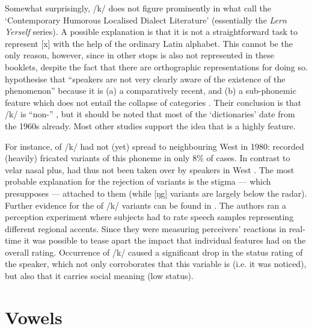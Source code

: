 Somewhat surprisingly, /k/  does not figure prominently in what \textcite{honeybonewatson2013} call the `Contemporary Humorous Localised Dialect Literature' (essentially the \emph{Lern Yerself } series).
A possible explanation is that it is not a straightforward task to represent [x] with the help of the ordinary Latin alphabet.
This cannot be the only reason, however, since  in other stops is also not represented in these booklets, despite the fact that there are orthographic representations for doing so.
\textcite{honeybonewatson2013} hypothesise that ``speakers are not very clearly aware of the existence of the phenomenon'' because it is (a) a comparatively recent, and (b) a sub-phonemic feature which does not entail the collapse of categories \parencite[cf.][329--331]{honeybonewatson2013}.
Their conclusion is that /k/  is ``non-'' \parencite[333]{honeybonewatson2013}, but it should be noted that most of the  `dictionaries' date from the 1960s already.
Most other studies support the idea that  is a highly  feature.

For instance,  of /k/ had not (yet) spread to neighbouring West  in 1980: \textcite[97]{newbrook1999} recorded (heavily) fricated variants of this phoneme in only 8\% of cases.
In contrast to velar nasal plus,   had thus not been taken over by speakers in West .
The most probable explanation for the rejection of  variants is the stigma --- which presupposes  --- attached to them (while [ŋg] variants are largely below the radar).
Further evidence for the  of  /k/ variants can be found in \citealt{watsonclark2015}.
The authors ran a perception experiment where subjects had to rate speech samples representing different regional accents.
Since they were measuring perceivers' reactions in real-time it was possible to tease apart the impact that individual features had on the overall rating.
Occurrence of /k/  caused a significant drop in the status rating of the speaker, which not only corroborates that this variable is  (i.e. it was noticed), but also that it carries social meaning (low status).

	\section{Vowels}\label{sec.var.vow}

